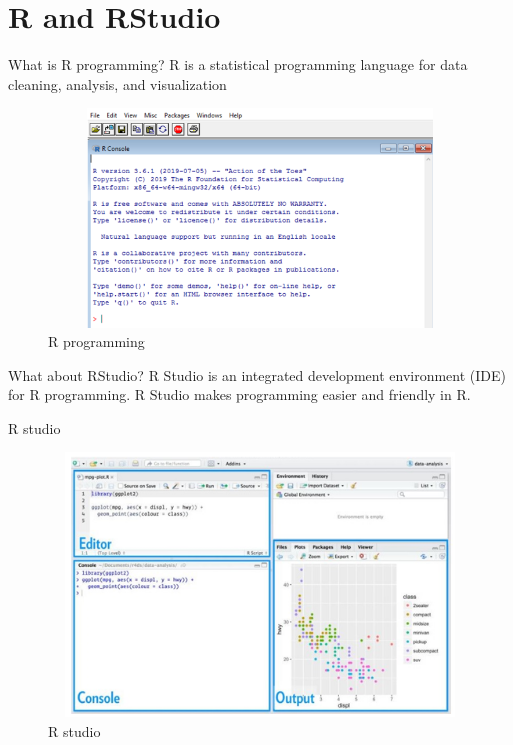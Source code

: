 \documentclass[
  ignorenonframetext,
]{beamer}
\begin{document}
\section{R and RStudio}
\begin{frame}{What is R programming?}
\protect\hypertarget{what-is-r-programming}{}
\pause
R is a statistical programming language for data cleaning, analysis, and visualization \pause

\begin{figure}
\centering
\includegraphics[height=5.8cm, width=13cm]{Images/R.png}
\caption{R programming}
\end{figure}

\end{frame}

\begin{frame}{What about RStudio?}
\protect\hypertarget{what-about-rstudio}{}
\pause
R Studio is an integrated development environment (IDE) for R
programming. R Studio makes programming easier and friendly in R.

\end{frame}

\begin{frame}{R studio}
\protect\hypertarget{r-studio}{}

\begin{figure}
\centering
\includegraphics[height=7cm, width= 12cm]{Images/R_studio.PNG}
\caption{R studio}
\end{figure}

\end{frame}
\end{document}

